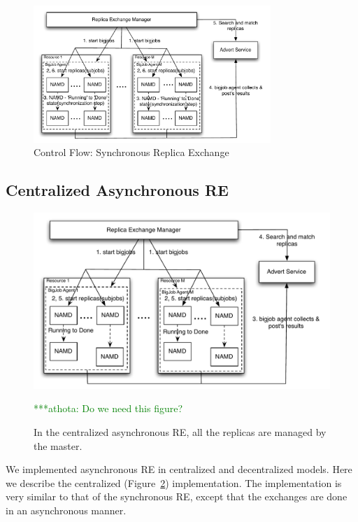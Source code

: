 \documentclass{rspublic}
\newcommand{\athotanote}[1]{ {\textcolor{green} { ***athota: #1 }}}
\newcommand{\athotanote}[1]{}
\begin{document}
\begin{figure}[t]
      \centering
          \includegraphics[width=0.8\textwidth]{synchronous.pdf}
          \caption{\footnotesize Control Flow: Synchronous Replica Exchange
              }
      \label{fig:sync}
\end{figure}


\subsection{Centralized Asynchronous RE}


\begin{figure}
\centering
\includegraphics[width=1\textwidth]{centralized.pdf}
\caption{\small  In the centralized asynchronous RE, all the replicas are managed by the master.} \athotanote{Do we need this figure?} 
\label{fig:cent}
\end{figure}

We implemented asynchronous RE in centralized and decentralized models. Here we describe the centralized (Figure~\ref{fig:cent}) implementation. The implementation is very similar to that of the synchronous RE, except that the exchanges are done in an asynchronous manner. 
\end{document}
